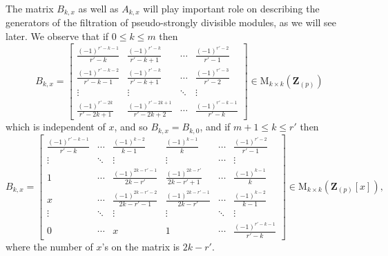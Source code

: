 \documentclass[11pt]{amsart}
\theoremstyle{definition}
\numberwithin{equation}{subsection}
\theoremstyle{plain}
\theoremstyle{plain}
\theoremstyle{plain}
\theoremstyle{plain}
\theoremstyle{plain}
\theoremstyle{plain}
\theoremstyle{plain}
\theoremstyle{plain}
\theoremstyle{plain}
\theoremstyle{plain}
\theoremstyle{plain}
\theoremstyle{plain}
\theoremstyle{definition}
\theoremstyle{definition}
\theoremstyle{definition}
\theoremstyle{remark}
\renewcommand{\(}{\textup{(}}
\renewcommand{\)}{\textup{)}}
\newcommand{\M}{\mathrm{M}}
\newcommand{\Z}{\mathbf{Z}}
\begin{document}
The matrix $B_{k,x}$ as well as $A_{k,x}$ will play important role on describing the generators of the filtration of pseudo-strongly divisible modules, as we will see later. We observe that if $0\leq k\leq m$ then
\begin{equation}\label{eq: B_k,x when k leq m}
    B_{k,x}
    =
    \begin{bmatrix}
        \frac{(-1)^{r'-k-1}}{r'-k} & \frac{(-1)^{r'-k}}{r'-k+1} & \cdots & \frac{(-1)^{r'-2}}{r'-1} \\
        \frac{(-1)^{r'-k-2}}{r'-k-1} & \frac{(-1)^{r'-k}}{r'-k+1} & \cdots & \frac{(-1)^{r'-3}}{r'-2} \\
        \vdots & \vdots & \ddots & \vdots \\
        \frac{(-1)^{r'-2k}}{r'-2k+1} & \frac{(-1)^{r'-2k+1}}{r'-2k+2} & \cdots & \frac{(-1)^{r'-k-1}}{r'-k}
    \end{bmatrix}
    \in \M_{k\times k}(\Z_{(p)})
\end{equation}
which is independent of $x$, and so $B_{k,x}=B_{k,0}$, and if $m+1\leq k\leq r'$ then
\begin{equation}\label{eq: B_k,x when k geq m+1}
    B_{k,x}
    =\begin{bmatrix}
        \frac{(-1)^{r'-k-1}}{r'-k} & \cdots & \frac{(-1)^{k-2}}{k-1} & \frac{(-1)^{k-1}}{k} & \cdots & \frac{(-1)^{r'-2}}{r'-1} \\
        \vdots & \ddots & \vdots & \vdots & \cdots & \vdots \\
        1 & \cdots & \frac{(-1)^{2k-r'-1}}{2k-r'} & \frac{(-1)^{2k-r'}}{2k-r'+1} & \cdots & \frac{(-1)^{k-1}}{k} \\
        x & \cdots & \frac{(-1)^{2k-r'-2}}{2k-r'-1} & \frac{(-1)^{2k-r'-1}}{2k-r'} & \cdots & \frac{(-1)^{k-2}}{k-1} \\
        \vdots & \ddots & \vdots & \vdots & \ddots & \vdots \\
        0 & \cdots & x & 1 & \cdots & \frac{(-1)^{r'-k-1}}{r'-k}
    \end{bmatrix}\in \M_{k\times k}(\Z_{(p)}[x]),
\end{equation}
where the number of $x$'s on the matrix is $2k-r'$.
\end{document}
